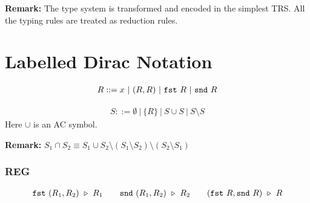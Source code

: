\textbf{Remark: } The type system is transformed and encoded in the simplest TRS. All the typing rules are treated as reduction rules.


\section{Labelled Dirac Notation}

\begin{definition}
  \begin{align*}
    R ::= x\ |\ (R, R)\ |\ \texttt{fst}\ R\ |\ \texttt{snd}\ R
  \end{align*}
\end{definition}


\begin{definition}
  \begin{align*}
    S ::= \emptyset\ |\ \{ R \} \ |\ S \cup S\ |\ S \setminus S
  \end{align*}  
  Here $\cup$ is an AC symbol.
\end{definition}

\textbf{Remark: } $ S_1 \cap S_2 \equiv S_1 \cup S_2 \setminus (S_1 \setminus S_2) \setminus (S_2 \setminus S_1) $

\subsubsection*{\textsf{REG}}
\begin{align*}
  \texttt{fst}\ (R_1, R_2) \ \triangleright\  R_1 \qquad 
  \texttt{snd}\ (R_1, R_2) \ \triangleright\  R_2 \qquad
  (\texttt{fst}\ R, \texttt{snd}\ R) \ \triangleright\  R
\end{align*}


